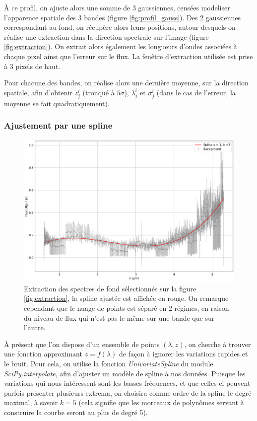 \documentclass[11pt, a4paper]{article}
\begin{document}
À ce profil, on ajuste alors une somme de 3 gaussiennes, censées modeliser l'apparence spatiale des 3 bandes (figure \ref{fig:profil_gauss}). Des 2 gaussiennes correspondant au fond, on récupère alors leurs positions, autour desquels on réalise une extraction dans la direction spectrale sur l'image (figure \ref{fig:extraction}). On extrait alors également les longueurs d'ondes associées à chaque pixel ainsi que l'erreur sur le flux. La fenêtre d'extraction utilisée est prise à 3 pixels de haut.

Pour chacune des bandes, on réalise alors une dernière moyenne, sur la direction spatiale, afin d'obtenir $z^i_j$ (tronqué à $5\sigma$), $\lambda^i_j$ et $\sigma^i_j$ (dans le cas de l'erreur, la moyenne se fait quadratiquement).

\subsubsection{Ajustement par une spline}

\begin{figure}
  \centering
  \includegraphics[scale=0.27]{assets/fit_spline.png}
  \caption{Extraction des spectres de fond sélectionnés sur la figure \ref{fig:extraction}, la spline ajustée est affichée en rouge. On remarque cependant que le nuage de points est séparé en 2 régimes, en raison du niveau de flux qui n'est pas le même sur une bande que sur l'autre.}
  \label{fig:spline_fit}
\end{figure}

À présent que l'on dispose d'un ensemble de points $(\lambda, z)$, on cherche à trouver une fonction approximant $z = f(\lambda)$ de façon à ignorer les variations rapides et le bruit. Pour cela, on utilise la fonction \textit{UnivariateSpline} du module \textit{SciPy.interpolate}, afin d'ajuster un modèle de spline à nos données. Puisque les variations qui nous intéressent sont les basses fréquences, et que celles ci peuvent parfois présenter plusieurs extrema, on choisira comme ordre de la spline le degré maximal, à savoir $k=5$ (cela signifie que les morceaux de polynômes servant à construire la courbe seront au plus de degré 5). 
\end{document}
